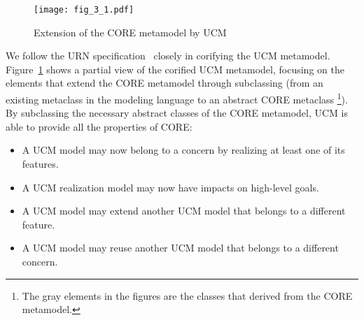 \begin{figure}
	\centering
	\texttt{[image: fig\_3\_1.pdf]}
	\caption{Extension of the CORE metamodel by UCM}
	\label{fig:3.1}
\end{figure}

We follow the URN specification~\cite{itu2012151} closely in corifying the UCM metamodel. Figure~\ref{fig:3.1} shows a partial view of the corified UCM metamodel, focusing on the elements that extend the CORE metamodel through subclassing (from an existing metaclass in the modeling language to an abstract CORE metaclass \footnote{The gray elements in the figures are the classes that derived from the CORE metamodel.}). By subclassing the necessary abstract classes of the CORE metamodel, UCM is able to provide all the properties of CORE:

\begin{itemize}
	\setlength{\parskip}{0pt} \setlength{\itemsep}{0pt}
	\item A UCM model may now belong to a concern by realizing at least one of its features.
	\item A UCM realization model may now have impacts on high-level goals.
	\item A UCM model may extend another UCM model that belongs to a different feature.
	\item A UCM model may reuse another UCM model that belongs to a different concern.
\end{itemize}


